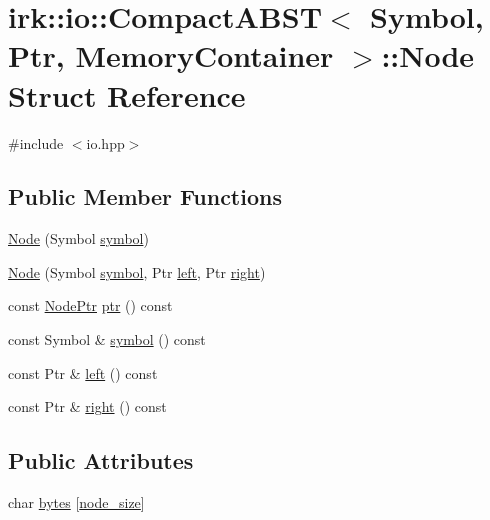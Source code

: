 \hypertarget{structirk_1_1io_1_1CompactABST_1_1Node}{}\section{irk\+:\+:io\+:\+:Compact\+A\+B\+ST$<$ Symbol, Ptr, Memory\+Container $>$\+:\+:Node Struct Reference}
\label{structirk_1_1io_1_1CompactABST_1_1Node}


{\ttfamily \#include $<$io.\+hpp$>$}

\subsection*{Public Member Functions}
\begin{DoxyCompactItemize}
\item 
\mbox{\hyperlink{structirk_1_1io_1_1CompactABST_1_1Node_a5eec0c71885954fa52c4dcdec5ba028d}{Node}} (Symbol \mbox{\hyperlink{porter2_8hpp_a04438e24473719aaf288c57833717164}{symbol}})
\item 
\mbox{\hyperlink{structirk_1_1io_1_1CompactABST_1_1Node_a3c77a6bfd7c39d640374c2367b678d2a}{Node}} (Symbol \mbox{\hyperlink{porter2_8hpp_a04438e24473719aaf288c57833717164}{symbol}}, Ptr \mbox{\hyperlink{structirk_1_1io_1_1CompactABST_1_1Node_a312addc207f8a0c75feb8718e05df7c3}{left}}, Ptr \mbox{\hyperlink{structirk_1_1io_1_1CompactABST_1_1Node_a7444ab4727023ff97740e139265bb4be}{right}})
\item 
const \mbox{\hyperlink{structirk_1_1io_1_1CompactABST_1_1NodePtr}{Node\+Ptr}} \mbox{\hyperlink{structirk_1_1io_1_1CompactABST_1_1Node_a83752e75d980f93a5a1aab8832c1170e}{ptr}} () const
\item 
const Symbol \& \mbox{\hyperlink{structirk_1_1io_1_1CompactABST_1_1Node_ad0c9be37068d8febb3d50201a39f2a62}{symbol}} () const
\item 
const Ptr \& \mbox{\hyperlink{structirk_1_1io_1_1CompactABST_1_1Node_a312addc207f8a0c75feb8718e05df7c3}{left}} () const
\item 
const Ptr \& \mbox{\hyperlink{structirk_1_1io_1_1CompactABST_1_1Node_a7444ab4727023ff97740e139265bb4be}{right}} () const
\end{DoxyCompactItemize}
\subsection*{Public Attributes}
\begin{DoxyCompactItemize}
\item 
char \mbox{\hyperlink{structirk_1_1io_1_1CompactABST_1_1Node_a5a1367440b6f9f5ea3ebe13e19dd359a}{bytes}} \mbox{[}\mbox{\hyperlink{classirk_1_1io_1_1CompactABST_a7d730c8d8ba0519397927b08dea7dbbb}{node\+\_\+size}}\mbox{]}
\end{DoxyCompactItemize}


